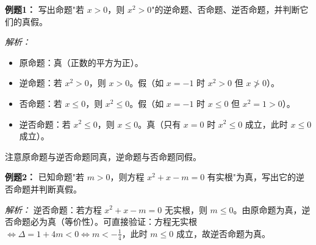 \begin{examplebox}
\textbf{例题1：} 写出命题"若 \(x>0\)，则 \(x^2>0\)"的逆命题、否命题、逆否命题，并判断它们的真假。

\textit{解析：}
\begin{itemize}
    \item 原命题：真（正数的平方为正）。
    \item 逆命题：若 \(x^2>0\)，则 \(x>0\)。假（如 \(x=-1\) 时 \(x^2>0\) 但 \(x\not>0\)）。
    \item 否命题：若 \(x\le 0\)，则 \(x^2\le 0\)。假（如 \(x=-1\) 时 \(x\le0\) 但 \(x^2=1>0\)）。
    \item 逆否命题：若 \(x^2\le0\)，则 \(x\le0\)。真（只有 \(x=0\) 时 \(x^2\le0\) 成立，此时 \(x\le0\) 成立）。
\end{itemize}
注意原命题与逆否命题同真，逆命题与否命题同假。
\end{examplebox}

\begin{examplebox}
\textbf{例题2：} 已知命题"若 \(m>0\)，则方程 \(x^2+x-m=0\) 有实根"为真，写出它的逆否命题并判断真假。

\textit{解析：} 逆否命题：若方程 \(x^2+x-m=0\) 无实根，则 \(m\le 0\)。由原命题为真，逆否命题必为真（等价性）。可直接验证：方程无实根 \(\Leftrightarrow \Delta=1+4m<0\Leftrightarrow m<-\frac14\)，此时 \(m\le0\) 成立，故逆否命题为真。
\end{examplebox}